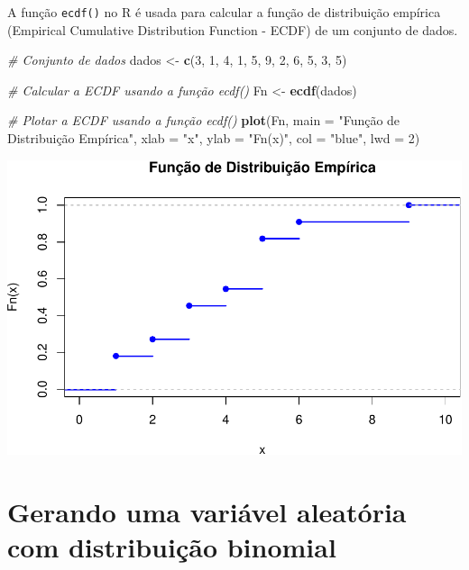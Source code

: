 \documentclass[
]{book}
\newenvironment{Shaded}{\begin{snugshade}}{\end{snugshade}}
\newcommand{\AttributeTok}[1]{\textcolor[rgb]{0.13,0.29,0.53}{#1}}
\newcommand{\CommentTok}[1]{\textcolor[rgb]{0.56,0.35,0.01}{\textit{#1}}}
\newcommand{\DecValTok}[1]{\textcolor[rgb]{0.00,0.00,0.81}{#1}}
\newcommand{\FunctionTok}[1]{\textcolor[rgb]{0.13,0.29,0.53}{\textbf{#1}}}
\newcommand{\NormalTok}[1]{#1}
\newcommand{\OtherTok}[1]{\textcolor[rgb]{0.56,0.35,0.01}{#1}}
\newcommand{\StringTok}[1]{\textcolor[rgb]{0.31,0.60,0.02}{#1}}
\begin{document}
A função \texttt{ecdf()} no R é usada para calcular a função de distribuição empírica (Empirical Cumulative Distribution Function - ECDF) de um conjunto de dados.

\begin{Shaded}
\begin{Highlighting}[]
\CommentTok{\# Conjunto de dados}
\NormalTok{dados }\OtherTok{\textless{}{-}} \FunctionTok{c}\NormalTok{(}\DecValTok{3}\NormalTok{, }\DecValTok{1}\NormalTok{, }\DecValTok{4}\NormalTok{, }\DecValTok{1}\NormalTok{, }\DecValTok{5}\NormalTok{, }\DecValTok{9}\NormalTok{, }\DecValTok{2}\NormalTok{, }\DecValTok{6}\NormalTok{, }\DecValTok{5}\NormalTok{, }\DecValTok{3}\NormalTok{, }\DecValTok{5}\NormalTok{)}

\CommentTok{\# Calcular a ECDF usando a função ecdf()}
\NormalTok{Fn }\OtherTok{\textless{}{-}} \FunctionTok{ecdf}\NormalTok{(dados)}

\CommentTok{\# Plotar a ECDF usando a função ecdf()}
\FunctionTok{plot}\NormalTok{(Fn, }\AttributeTok{main =} \StringTok{"Função de Distribuição Empírica"}\NormalTok{, }\AttributeTok{xlab =} \StringTok{"x"}\NormalTok{, }\AttributeTok{ylab =} \StringTok{"Fn(x)"}\NormalTok{, }\AttributeTok{col =} \StringTok{"blue"}\NormalTok{, }\AttributeTok{lwd =} \DecValTok{2}\NormalTok{)}
\end{Highlighting}
\end{Shaded}

\includegraphics{meuLivro2_files/figure-latex/unnamed-chunk-112-1.pdf}

\section{Gerando uma variável aleatória com distribuição binomial}\label{gerando-uma-variuxe1vel-aleatuxf3ria-com-distribuiuxe7uxe3o-binomial}
\end{document}
